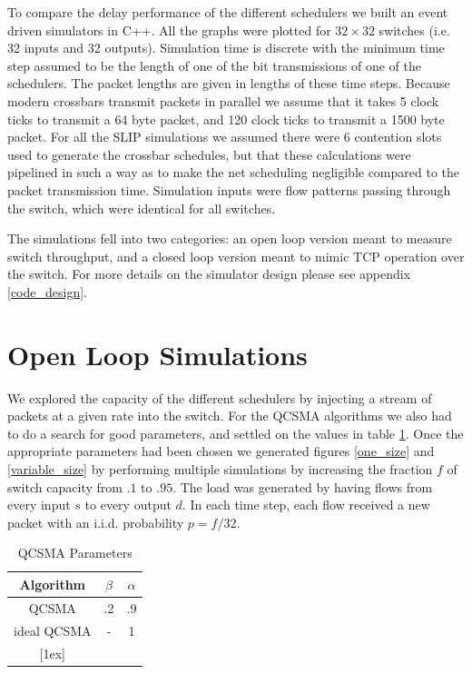 \documentclass[11pt]{article}%
\begin{document}
To compare the delay performance of the different schedulers we built an event driven simulators in C++.  All the graphs were plotted for $32 \times 32$ switches (i.e. 32 inputs and 32 outputs).  Simulation time is discrete with the minimum time step assumed to be the length of one of the bit transmissions of one of the schedulers.   The packet lengths are given in lengths of these time steps.  Because modern crossbars transmit packets in parallel we assume that it takes 5 clock ticks to transmit a 64 byte packet, and 120 clock ticks to transmit a 1500 byte packet.  For all the SLIP simulations we assumed there were $6$ contention slots used to generate the crossbar schedules, but that these calculations were pipelined in such a way as to make the net scheduling negligible compared to the packet transmission time.  Simulation inputs were flow patterns passing through the switch, which were identical for all switches. %

 The simulations fell into two categories: an open loop version meant to measure switch throughput, and a closed loop version meant to mimic TCP operation over the switch.  For more details on the simulator design please see appendix \ref{code_design}.%
 
\section{Open Loop Simulations} \label{open}

We explored the capacity of the different schedulers by injecting a stream of packets at a given rate into the switch.  For the QCSMA algorithms we also had to do a search for good parameters, and settled on the values in table \ref{qcsma_parameters}.  Once the appropriate parameters had been chosen we generated figures \ref{one_size} and \ref{variable_size} by performing multiple simulations by increasing the fraction $f$ of switch capacity from $.1$ to $.95$.  The load was generated by having flows from every input $s$ to every output $d$.  In each time step, each flow received a new packet with an i.i.d. probability $p=f/32$.

\begin{table}[ht] \caption{QCSMA Parameters} 
\centering 
\begin{tabular}{c c c}
 \hline\hline 
 Algorithm & $\beta$ & $\alpha$ \\
  [0.5ex] \hline 
   QCSMA&.2&.9  \\
   ideal  QCSMA&-&1  \\
  [1ex] \hline 
  \end{tabular}
   \label{qcsma_parameters} 
\end{table}
\end{document}
